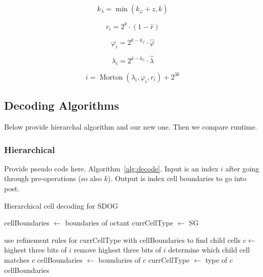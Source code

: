 \begin{equation*}
k_\lambda = \min ( k_\varphi + z, k )
\end{equation*}

\begin{equation*}
r_i = 2^k \cdot ( 1 - \hat{r} )
\end{equation*}

\begin{equation*}
\varphi_i = 2^{k - k_\varphi} \cdot \hat{\varphi}
\end{equation*}

\begin{equation*}
\lambda_i = 2^{k - k_\lambda} \cdot \hat{\lambda}
\end{equation*}

\begin{equation*}
i = \operatorname{Morton}( \lambda_i, \varphi_i, r_i ) + 2^{3k}
\end{equation*}


\subsection{Decoding Algorithms}
Below provide hierarchal algorithm and our new one.
Then we compare runtime.


\subsubsection{Hierarchical}
Provide pseudo code here.
Algorithm~\ref{alg:decode}. Input is an index $i$ after going through pre-operations (so also $k$). Output is index cell boundaries to go into post.


\begin{algorithm}
	\caption{Hierarchical cell decoding for SDOG}
	
	\begin{algorithmic}
		
		\STATE cellBoundaries $\leftarrow$ boundaries of octant
		\STATE currCellType $\leftarrow$ SG
		
			\STATE use refinement rules for currCellType with cellBoundaries to find child cells
			\STATE $c \leftarrow$ highest three bits of $i$
			\STATE remove highest three bits of $i$
			\STATE determine which child cell matches $c$
			\STATE cellBoundaries $\leftarrow$ boundaries of $c$
			\STATE currCellType $\leftarrow$ type of $c$
		\ENDFOR
		\RETURN cellBoundaries
		
	\end{algorithmic}
	\label{alg:decode}
\end{algorithm}


